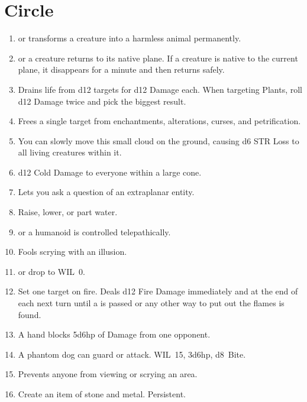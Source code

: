 \documentclass[itdr]{subfiles}
\begin{document}
\vfill
\break

\section{ Circle}
\def \spellcircle {5}
\begin{enumerate}
	\item {}  or transforms a creature into a harmless animal permanently.
	\item {}  or a creature returns to its native plane. If a creature is native to the current plane, it disappears for a minute and then returns safely.
	\item {} Drains life from d12 targets for d12 Damage each. When targeting Plants, roll d12 Damage twice and pick the biggest result.
	\item {} Frees a single target from enchantments, alterations, curses, and \mbox{petrification}.
	\item {} You can slowly move this small cloud on the ground, causing d6 STR Loss to all living creatures within it.
	\item {} d12 Cold Damage to everyone within a large cone.
	\item {} Lets you ask a question of an extraplanar entity.
	\item {} Raise, lower, or part water.
	\item {}  or a humanoid is controlled telepathically.
	\item {} Fools scrying with an illusion.
	\item {}  or drop to WIL~0.
	\item {} Set one target on fire. Deals d12 Fire Damage immediately and at the end of each next turn until a  is passed or any other way to put out the flames is found.
	\item {} A hand blocks 5d6hp of Damage from one opponent.
	\item {} A phantom dog can guard or attack. WIL~15, 3d6hp, d8~Bite.
	\item {} Prevents anyone from viewing or scrying an area.
	\item {} Create an item of stone and metal. Persistent.

\end{enumerate}
\end{document}
